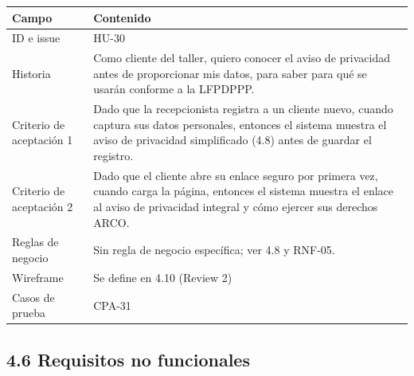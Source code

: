 {\def\LTcaptype{none} %
\begin{longtable}[]{@{}
  >{\raggedright\arraybackslash}p{}
  >{\raggedright\arraybackslash}p{}@{}}
\toprule\noalign{}
\begin{minipage}[b]{\linewidth}\raggedright
\textbf{Campo}
\end{minipage} & \begin{minipage}[b]{\linewidth}\raggedright
\textbf{Contenido}
\end{minipage} \\
\midrule\noalign{}
\endhead
\bottomrule\noalign{}
\endlastfoot
ID e issue & HU-30 \\
Historia & Como cliente del taller, quiero conocer el aviso de
privacidad antes de proporcionar mis datos, para saber para qué se
usarán conforme a la LFPDPPP. \\
Criterio de aceptación 1 & Dado que la recepcionista registra a un
cliente nuevo, cuando captura sus datos personales, entonces el sistema
muestra el aviso de privacidad simplificado (4.8) antes de guardar el
registro. \\
Criterio de aceptación 2 & Dado que el cliente abre su enlace seguro por
primera vez, cuando carga la página, entonces el sistema muestra el
enlace al aviso de privacidad integral y cómo ejercer sus derechos
ARCO. \\
Reglas de negocio & Sin regla de negocio específica; ver 4.8 y
RNF-05. \\
Wireframe & Se define en 4.10 (Review 2) \\
Casos de prueba & CPA-31 \\
\end{longtable}
}


\subsection{4.6 Requisitos no
funcionales}\label{requisitos-no-funcionales}

